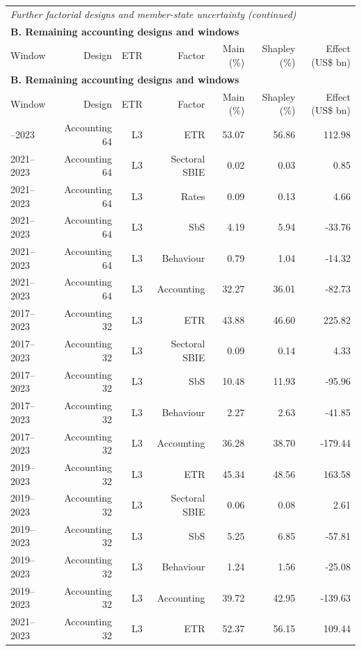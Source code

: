 {\addtocounter{table}{-1}
\begin{longtable}{@{}lrrrrrr@{}}
\multicolumn{7}{l}{\textit{Further factorial designs and member-state uncertainty (continued)}} \\
\multicolumn{7}{l}{\textbf{B. Remaining accounting designs and windows}} \\
\toprule
Window & Design & ETR & Factor & Main (\%) & Shapley (\%) & Effect (US\$ bn) \\
\midrule
\endfirsthead
\multicolumn{7}{l}{\textbf{B. Remaining accounting designs and windows}} \\
\toprule
Window & Design & ETR & Factor & Main (\%) & Shapley (\%) & Effect (US\$ bn) \\
\midrule
\endhead
\midrule
\endfoot
\bottomrule
\endlastfoot
2021–2023 & Accounting 64 & L3 & ETR & 53.07 & 56.86 &  112.98 \\
2021–2023 & Accounting 64 & L3 & Sectoral SBIE &  0.02 &  0.03 &    0.85 \\
2021–2023 & Accounting 64 & L3 & Rates &  0.09 &  0.13 &    4.66 \\
2021–2023 & Accounting 64 & L3 & SbS &  4.19 &  5.94 &  -33.76 \\
2021–2023 & Accounting 64 & L3 & Behaviour &  0.79 &  1.04 &  -14.32 \\
2021–2023 & Accounting 64 & L3 & Accounting & 32.27 & 36.01 &  -82.73 \\
2017–2023 & Accounting 32 & L3 & ETR & 43.88 & 46.60 &  225.82 \\
2017–2023 & Accounting 32 & L3 & Sectoral SBIE &  0.09 &  0.14 &    4.33 \\
2017–2023 & Accounting 32 & L3 & SbS & 10.48 & 11.93 &  -95.96 \\
2017–2023 & Accounting 32 & L3 & Behaviour &  2.27 &  2.63 &  -41.85 \\
2017–2023 & Accounting 32 & L3 & Accounting & 36.28 & 38.70 & -179.44 \\
2019–2023 & Accounting 32 & L3 & ETR & 45.34 & 48.56 &  163.58 \\
2019–2023 & Accounting 32 & L3 & Sectoral SBIE &  0.06 &  0.08 &    2.61 \\
2019–2023 & Accounting 32 & L3 & SbS &  5.25 &  6.85 &  -57.81 \\
2019–2023 & Accounting 32 & L3 & Behaviour &  1.24 &  1.56 &  -25.08 \\
2019–2023 & Accounting 32 & L3 & Accounting & 39.72 & 42.95 & -139.63 \\
2021–2023 & Accounting 32 & L3 & ETR & 52.37 & 56.15 &  109.44 \\

\end{longtable}}
